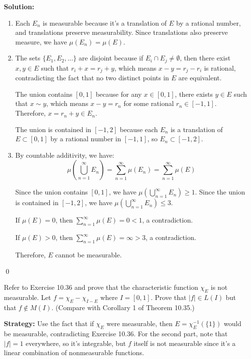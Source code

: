 \bigskip\noindent\textbf{Solution:}
\begin{enumerate}[label=(\alph*)]
\item Each $E_n$ is measurable because it's a translation of $E$ by a rational number, and translations preserve measurability. Since translations also preserve measure, we have $\mu(E_n) = \mu(E)$.

\item The sets $\{E_1, E_2, \ldots \}$ are disjoint because if $E_i \cap E_j \neq \emptyset$, then there exist $x, y \in E$ such that $r_i + x = r_j + y$, which means $x - y = r_j - r_i$ is rational, contradicting the fact that no two distinct points in $E$ are equivalent.

The union contains $[0, 1]$ because for any $x \in [0, 1]$, there exists $y \in E$ such that $x \sim y$, which means $x - y = r_n$ for some rational $r_n \in [-1, 1]$. Therefore, $x = r_n + y \in E_n$.

The union is contained in $[-1, 2]$ because each $E_n$ is a translation of $E \subset [0, 1]$ by a rational number in $[-1, 1]$, so $E_n \subset [-1, 2]$.

\item By countable additivity, we have:
\[\mu\left(\bigcup_{n=1}^{\infty} E_n\right) = \sum_{n=1}^{\infty} \mu(E_n) = \sum_{n=1}^{\infty} \mu(E)\]

Since the union contains $[0, 1]$, we have $\mu(\bigcup_{n=1}^{\infty} E_n) \geq 1$. Since the union is contained in $[-1, 2]$, we have $\mu(\bigcup_{n=1}^{\infty} E_n) \leq 3$.

If $\mu(E) = 0$, then $\sum_{n=1}^{\infty} \mu(E) = 0 < 1$, a contradiction.

If $\mu(E) > 0$, then $\sum_{n=1}^{\infty} \mu(E) = \infty > 3$, a contradiction.

Therefore, $E$ cannot be measurable.
\end{enumerate}\qed


\begin{problembox}
Refer to Exercise 10.36 and prove that the characteristic function $\chi_E$ is not measurable. Let $f = \chi_E - \chi_{I-E}$ where $I = [0, 1]$. Prove that $|f| \in L(I)$ but that $f \notin M(I)$. (Compare with Corollary 1 of Theorem 10.35.)
\end{problembox}

\noindent\textbf{Strategy:} Use the fact that if $\chi_E$ were measurable, then $E = \chi_E^{-1}(\{1\})$ would be measurable, contradicting Exercise 10.36. For the second part, note that $|f| = 1$ everywhere, so it's integrable, but $f$ itself is not measurable since it's a linear combination of nonmeasurable functions.


